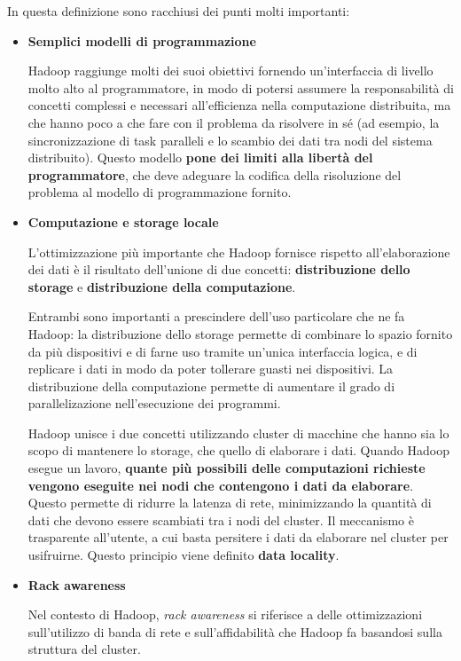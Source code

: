 \documentclass[italian,a4paper, twoside, 12pt]{report}
\begin{document}
In questa definizione sono racchiusi dei punti molti importanti:

\begin{itemize}
\item
  \textbf{Semplici modelli di programmazione}

  Hadoop raggiunge molti dei suoi obiettivi fornendo un'interfaccia di
  livello molto alto al programmatore, in modo di potersi assumere la
  responsabilità di concetti complessi e necessari all'efficienza nella
  computazione distribuita, ma che hanno poco a che fare con il problema
  da risolvere in sé (ad esempio, la sincronizzazione di task paralleli
  e lo scambio dei dati tra nodi del sistema distribuito). Questo
  modello \textbf{pone dei limiti alla libertà del programmatore}, che
  deve adeguare la codifica della risoluzione del problema al modello di
  programmazione fornito.
\item
  \textbf{Computazione e storage locale}

  L'ottimizzazione più importante che Hadoop fornisce rispetto
  all'elaborazione dei dati è il risultato dell'unione di due concetti:
  \textbf{distribuzione dello storage} e \textbf{distribuzione della
  computazione}.

  Entrambi sono importanti a prescindere dell'uso particolare che ne fa
  Hadoop: la distribuzione dello storage permette di combinare lo spazio
  fornito da più dispositivi e di farne uso tramite un'unica interfaccia
  logica, e di replicare i dati in modo da poter tollerare guasti nei
  dispositivi. La distribuzione della computazione permette di aumentare
  il grado di parallelizazione nell'esecuzione dei programmi.

  Hadoop unisce i due concetti utilizzando cluster di macchine che hanno
  sia lo scopo di mantenere lo storage, che quello di elaborare i dati.
  Quando Hadoop esegue un lavoro, \textbf{quante più possibili delle
  computazioni richieste vengono eseguite nei nodi che contengono i dati
  da elaborare}. Questo permette di ridurre la latenza di rete,
  minimizzando la quantità di dati che devono essere scambiati tra i
  nodi del cluster. Il meccanismo è trasparente all'utente, a cui basta
  persitere i dati da elaborare nel cluster per usifruirne. Questo
  principio viene definito \textbf{data locality}.
\item
  \textbf{Rack awareness}

  Nel contesto di Hadoop, \emph{rack awareness} si riferisce a delle
  ottimizzazioni sull'utilizzo di banda di rete e sull'affidabilità che
  Hadoop fa basandosi sulla struttura del cluster.


\end{itemize}
\end{document}
